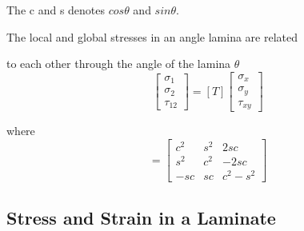 \documentclass[USenglish]{article}
\begin{document}
The c and s denotes $cos\theta $ and $sin\theta $.

The local and global stresses in an angle lamina are related

to each other through the angle of the lamina $\theta $
\begin{equation}\left[\begin{array}{l}\sigma _{1} \\ \sigma _{2} \\ \tau_{12}\end{array}\right]=[T]\left[\begin{array}{l}\sigma _{x} \\ \sigma _{y} \\\tau_{xy}\end{array}\right]
\end{equation}

where
\begin{equation}[T]=\left[\begin{array}{ccc}c^{2} & s^{2} & 2 s c \\ s^{2} & c^{2} & -2 s c \\ -s c & s c &c^{2}-s^{2}\end{array}\right] 
\end{equation}





\subsection{Stress and Strain in a Laminate}
\end{document}
